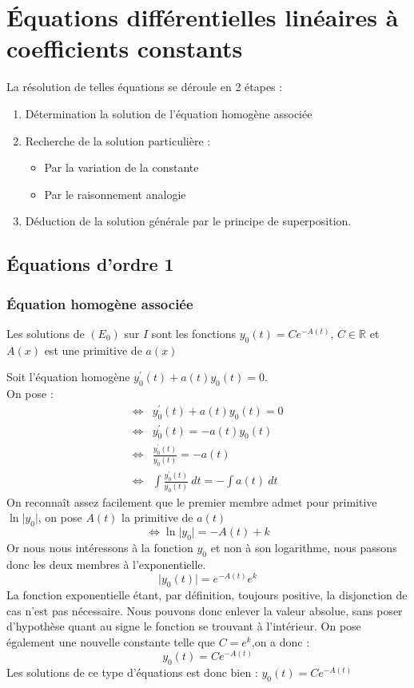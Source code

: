 \section{Équations différentielles linéaires à coefficients constants}
\begin{meth}
La résolution de telles équations se déroule en 2 étapes :
\begin{enumerate}
    \item Détermination la solution de l'équation homogène associée
    \item Recherche de la solution particulière :
    \begin{itemize}
        \item Par la variation de la constante
        \item Par le raisonnement analogie
    \end{itemize}
    \item Déduction de la solution générale par le principe de superposition.
\end{enumerate}
\end{meth}
\subsection{Équations d'ordre 1}
\subsubsection{Équation homogène associée}
\begin{thm}[Théorème]
Les solutions de $(E_0)$ sur $I$ sont les fonctions $y_0(t)=Ce^{-A(t)}$, $C\in\mathbb{R}$ et $A(x)$ est une primitive de $a(x)$
\end{thm}
\begin{demo}
Soit l'équation homogène $y_0^{\prime}(t)+a(t)y_0(t)=0$.\\
On pose :
\begin{align*}
    \Leftrightarrow & y_0^{\prime}(t)+a(t)y_0(t)=0\\
    \Leftrightarrow & y_0^{\prime}(t)=-a(t)y_0(t)\\
    \Leftrightarrow & \frac{y_0^{\prime}(t)}{y_0(t)}=-a(t)\\
    \Leftrightarrow & \int\frac{y_0^{\prime}(t)}{y_0(t)}\ dt = -\int a(t)\ dt
\end{align*}
On reconnaît assez facilement que le premier membre admet pour primitive $\ln\lvert y_0\rvert$, on pose $A(t)$ la primitive de $a(t)$
$$\Leftrightarrow\ln\lvert y_0\rvert=-A(t)+k$$
Or nous nous intéressons à la fonction $y_0$ et non à son logarithme, nous passons donc les deux membres à l'exponentielle.
$$\lvert y_0(t)\rvert=e^{-A(t)}e^{k}$$
La fonction exponentielle étant, par définition, toujours positive, la disjonction de cas n'est pas nécessaire.
Nous pouvons donc enlever la valeur absolue, sans poser d'hypothèse quant au signe le fonction se trouvant à l'intérieur. On pose également une nouvelle constante telle que $C=e^k$,on a donc :
$$y_0(t)=Ce^{-A(t)}$$
Les solutions de ce type d'équations est donc bien : $y_0(t)=Ce^{-A(t)}$
\end{demo}
